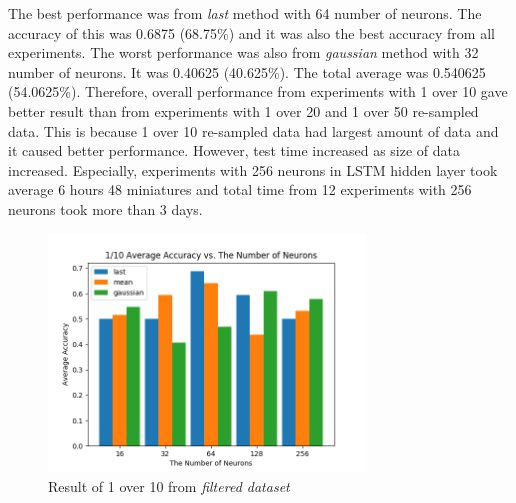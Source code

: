 \documentclass[draft,dvipsnames]{drexel-thesis}
\begin{document}
\begin{thesis}
The best performance was from {\em last} method with 64 number of neurons. The accuracy of this was 0.6875 (68.75\%) and it was also the best accuracy from all experiments. The worst performance was also from {\em gaussian} method with 32 number of neurons. It was 0.40625 (40.625\%). The total average was 0.540625 (54.0625\%). Therefore, overall performance from experiments with 1 over 10 gave better result than from experiments with 1 over 20 and 1 over 50 re-sampled data. This is because 1 over 10 re-sampled data had largest amount of data and it caused better performance. However, test time increased as size of data increased. Especially, experiments with 256 neurons in LSTM hidden layer took average 6 hours 48 miniatures and total time from 12 experiments with 256 neurons took more than 3 days.

\begin{figure}[t!]
    \centering
    \includegraphics[width=0.75\textwidth]{pictures/result_pictures/filtered_1_10_result.png}
    \caption{Result of 1 over 10 from {\em filtered dataset}}
    \label{fig:filter_1_10}
\end{figure}


\end{thesis}
\end{document}
